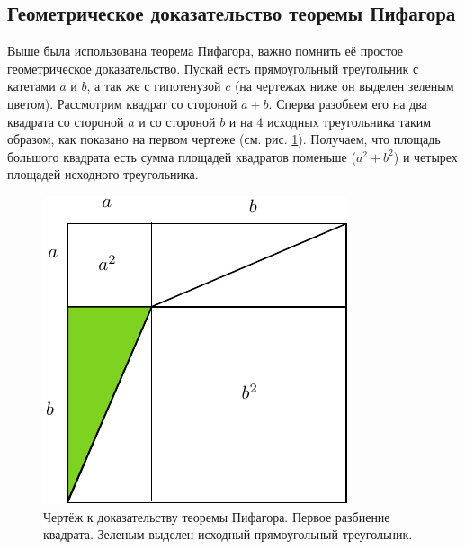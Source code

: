 \documentclass[a4paper,9pt,russian]{article}
\begin{document}
\subsection{Геометрическое доказательство теоремы Пифагора}
Выше была использована теорема Пифагора, важно помнить её простое геометрическое доказательство. Пускай есть прямоугольный треугольник с катетами $a$ и $b$, а так же с гипотенузой $c$ (на чертежах ниже он выделен зеленым цветом). Рассмотрим квадрат со стороной $a+b$. Сперва разобьем его на два квадрата со стороной $a$ и со стороной $b$ и на 4 исходных треугольника таким образом, как показано на первом чертеже (см. рис. \ref{fig:31}). Получаем, что площадь большого квадрата есть сумма площадей квадратов поменьше ($a^2+b^2$) и четырех площадей исходного треугольника.
\begin{figure}[ht]
	\centering
	\includegraphics[scale = 1]{first21.pdf}
	\caption{Чертёж к доказательству теоремы Пифагора. Первое разбиение квадрата. Зеленым выделен исходный прямоугольный треугольник.}
	\label{fig:31}
\end{figure}
\end{document}

